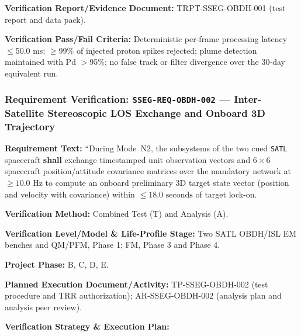 \par\textbf{Verification Report/Evidence Document:} TRPT-SSEG-OBDH-001 (test report and data pack).
\par\textbf{Verification Pass/Fail Criteria:} Deterministic per-frame processing latency $\le$50.0 ms; $\ge$99\% of injected proton spikes rejected; plume detection maintained with Pd $>$95\%; no false track or filter divergence over the 30-day equivalent run.
\par\medskip
\subsubsection{Requirement Verification: \texttt{SSEG-REQ-OBDH-002} --- Inter-Satellite Stereoscopic LOS Exchange and Onboard 3D Trajectory}
\label{ver:SSEG-REQ-OBDH-002}
\textbf{Requirement Text:} ``During Mode~N2, the  subsystems of the two cued \texttt{SATL} spacecraft \textbf{shall} exchange timestamped  unit observation vectors and $6 \times 6$ spacecraft position/attitude covariance matrices over the mandatory  network at $\ge 10.0\text{ Hz}$ to compute an onboard preliminary 3D target state vector (position and velocity with covariance) within $\le 18.0\text{ seconds}$ of target lock-on.
\par\textbf{Verification Method:} Combined Test (T) and Analysis (A).
\par\textbf{Verification Level/Model \& Life-Profile Stage:} Two SATL OBDH/ISL EM benches and QM/PFM, Phase 1; FM, Phase 3 and Phase 4.
\par\textbf{Project Phase:} B, C, D, E.
\par\textbf{Planned Execution Document/Activity:} TP-SSEG-OBDH-002 (test procedure and TRR authorization); AR-SSEG-OBDH-002 (analysis plan and analysis peer review).
\par\textbf{Verification Strategy \& Execution Plan:}
